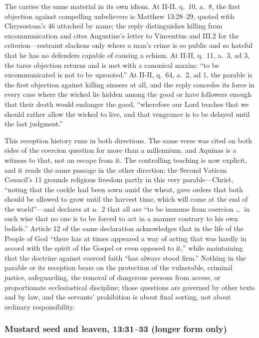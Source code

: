 The  carries the same material in its own idiom. At II-II, q.\ 10, a.\ 8, the first objection against compelling
unbelievers is Matthew 13:28--29, quoted with Chrysostom's  46
attached by name; the reply distinguishes killing from excommunication and
cites Augustine's letter to Vincentius and 
III.2 for the criterion---restraint slackens only where a man's crime is so
public and so hateful that he has no defenders capable of causing a schism. At
II-II, q.\ 11, a.\ 3, ad 3, the tares objection returns and is met with a
canonical maxim: ``to be excommunicated is not to be uprooted.'' At II-II, q.\
64, a.\ 2, ad 1, the parable is the first objection against killing sinners at
all, and the reply concedes its force in every case where the wicked lie hidden
among the good or have followers enough that their death would endanger the
good, ``wherefore our Lord teaches that we should rather allow the wicked to
live, and that vengeance is to be delayed until the last judgment.''

This reception history runs in both directions. The same
verse was cited on both sides of the coercion question for more than a
millennium, and Aquinas is a witness to that, not an escape from it. The
controlling teaching is now explicit, and it reads the same passage in the
other direction: the Second Vatican Council's \work{Dignitatis humanae} 11
grounds religious freedom partly in this very parable---Christ, ``noting that
the cockle had been sown amid the wheat, gave orders that both should be
allowed to grow until the harvest time, which will come at the end of the
world''---and declares at n.\ 2 that all are ``to be immune from coercion \dots\
in such wise that no one is to be forced to act in a manner contrary to his own
beliefs.'' Article 12 of the same declaration acknowledges that in the life of
the People of God ``there has at times appeared a way of acting that was hardly
in accord with the spirit of the Gospel or even opposed to it,'' while
maintaining that the doctrine against coerced faith ``has always stood firm.''
Nothing in the parable or its reception bears on the protection of the
vulnerable, criminal justice, safeguarding, the removal of dangerous persons
from access, or proportionate ecclesiastical discipline; those questions are
governed by other texts and by law, and the servants' prohibition is about
final sorting, not about ordinary responsibility.

\subsubsection*{Mustard seed and leaven, 13:31--33 (longer form only)}

